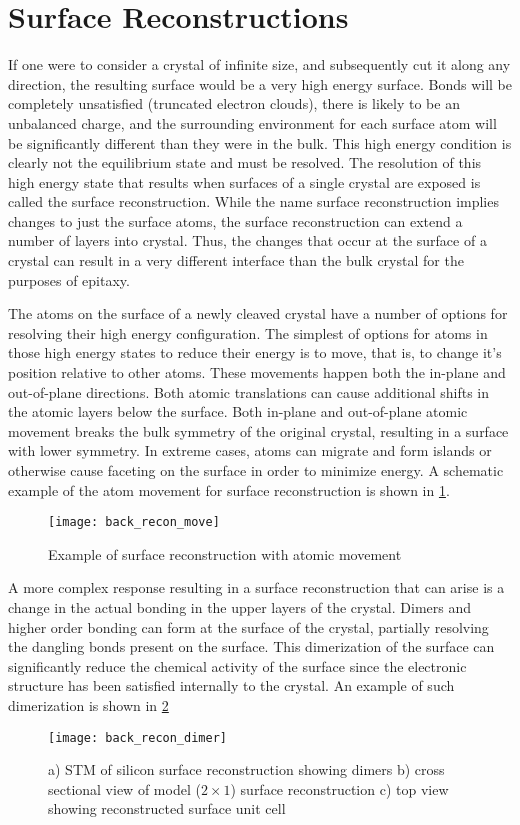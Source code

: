 \section{Surface Reconstructions}\label{sec:reconstruction}
If one were to consider a crystal of infinite size, and subsequently cut it along any direction, the resulting surface would be a very high energy surface. Bonds will be completely unsatisfied (truncated electron clouds), there is likely to be an unbalanced charge, and the surrounding environment for each surface atom will be significantly different than they were in the bulk. This high energy condition is clearly not the equilibrium state and must be resolved. The resolution of this high energy state that results when surfaces of a single crystal are exposed is called the surface reconstruction. While the name surface reconstruction implies changes to just the surface atoms, the surface reconstruction can extend a number of layers into crystal. Thus, the changes that occur at the surface of a crystal can result in a very different interface than the bulk crystal for the purposes of epitaxy.

The atoms on the surface of a newly cleaved crystal have a number of options for resolving their high energy configuration. The simplest of options for atoms in those high energy states to reduce their energy is to move, that is, to change it's position relative to other atoms. These movements happen both the in-plane and out-of-plane directions. Both atomic translations can cause additional shifts in the atomic layers below the surface.  Both in-plane and out-of-plane atomic movement breaks the bulk symmetry of the original crystal, resulting in a surface with lower symmetry. In extreme cases, atoms can migrate and form islands or otherwise cause faceting on the surface in order to minimize energy. A schematic example of the atom movement for surface reconstruction is shown in \cref{fig:back_recon_move}.
\begin{figure}
    \centering
    \texttt{[image: back\_recon\_move]}
    \caption[Simple surface reconstruction]{\label{fig:back_recon_move}Example of surface reconstruction with atomic movement\cite{ohring2001materials}}
\end{figure}

A more complex response resulting in a surface reconstruction that can arise is a change in the actual bonding in the upper layers of the crystal. Dimers and higher order bonding can form at the surface of the crystal, partially resolving the dangling bonds present on the surface. This dimerization of the surface can significantly reduce the chemical activity of the surface since the electronic structure has been satisfied internally to the crystal. An example of such dimerization is shown in \cref{fig:back_recon_dimer}
\begin{figure}
    \centering
    \texttt{[image: back\_recon\_dimer]}
    \caption[Silicon dimer surface reconstruction]{\label{fig:back_recon_dimer}a) STM of silicon surface reconstruction showing dimers b) cross sectional view of model ($2 \times 1$) surface reconstruction c) top view showing reconstructed surface unit cell \cite{ohring35}} 
\end{figure}

